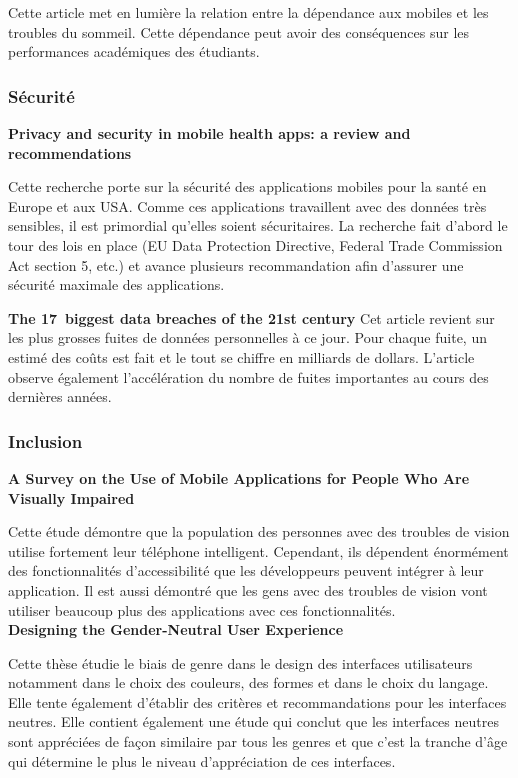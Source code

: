 		Cette article met en lumière la relation entre la dépendance aux mobiles et les troubles du sommeil. Cette dépendance peut avoir des conséquences sur les performances académiques des étudiants.
				
		\subsubsection{Sécurité}
		{\bfseries \cite{privacy} Privacy and security in mobile health apps: a review and recommendations}
		
		Cette recherche porte sur la sécurité des applications mobiles pour la santé en Europe et aux USA. Comme ces applications travaillent avec des données très sensibles, il est primordial qu'elles soient sécuritaires. La recherche fait d'abord le tour des lois en place (EU Data Protection Directive, Federal Trade Commission Act section 5, etc.) et avance plusieurs recommandation afin d'assurer une sécurité maximale des applications.
		
		{\bfseries \cite{dataBreach} The 17~biggest data breaches of the 21st century}
		Cet article revient sur les plus grosses fuites de données personnelles à ce jour. Pour chaque fuite, un estimé des coûts est fait et le tout se chiffre en milliards de dollars. L'article observe également l'accélération du nombre de fuites importantes au cours des dernières années.
		
		
		\subsubsection{Inclusion}
		{\bfseries \cite{visuallyImpaired} A Survey on the Use of Mobile Applications for People Who Are Visually Impaired}
		
		Cette étude démontre que la population des personnes avec des troubles de vision utilise fortement leur téléphone intelligent. Cependant, ils dépendent énormément des fonctionnalités d'accessibilité que les développeurs peuvent intégrer à leur application. Il est aussi démontré que les gens avec des troubles de vision vont utiliser beaucoup plus des applications avec ces fonctionnalités. \\
		
		{\bfseries \cite{genderNeutral} Designing the Gender-Neutral User Experience}
		
		Cette thèse étudie le biais de genre dans le design des interfaces utilisateurs notamment dans le choix des couleurs, des formes et dans le choix du langage. Elle tente également d'établir des critères et recommandations pour les interfaces neutres. Elle contient également une étude qui conclut que les interfaces neutres sont appréciées de façon similaire par tous les genres et que c'est la tranche d'âge qui détermine le plus le niveau d'appréciation de ces interfaces.
		
